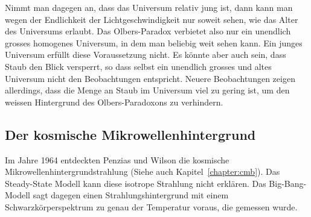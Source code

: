 Nimmt man dagegen an, dass das Universum relativ jung ist, dann kann
man wegen der Endlichkeit der Lichtgeschwindigkeit nur soweit sehen,
wie das Alter des Universums erlaubt.
Das Olbers-Paradox verbietet also nur ein unendlich grosses homogenes
Universum, in dem man beliebig weit sehen kann. 
Ein junges Universum erfüllt diese Voraussetzung nicht. 
Es könnte aber auch sein, dass Staub den Blick versperrt, so dass selbst
ein unendlich grosses und altes Universum nicht den Beobachtungen entspricht.
Neuere Beobachtungen zeigen allerdings, dass die Menge an Staub im
Universum viel zu gering ist, um den weissen Hintergrund des
Olbers-Paradoxons zu verhindern.

\subsection{Der kosmische Mikrowellenhintergrund}
Im Jahre 1964 entdeckten Penzias und Wilson die kosmische
Mikrowellenhintergrundstrahlung (Siehe auch Kapitel~\ref{chapter:cmb}).
Das Steady-State Modell kann diese isotrope Strahlung nicht erklären.
Das Big-Bang-Modell sagt dagegen einen Strahlungshintergrund mit einem
Schwarzkörperspektrum zu genau der Temperatur voraus, die gemessen
wurde.




